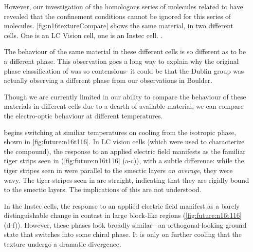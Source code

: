 \documentclass[aagreenthesis]{subfiles}
\begin{document}
However, our investigation of the homologous series of molecules related to
\nfour{} have revealed that the confinement conditions cannot be ignored for
this series of molecules. \autoref{fig:n16textureCompare} shows the same
material, \nsix{} in two different cells. One is an LC Vision cell, one is an
Instec cell.
.

The behaviour of the same material in these different cells is so different as
to be a different phase. This observation goes a long way to explain why the
original phase classification of \nfour{} was so contensious- it could be that
the Dublin group was actually observing a different phase from our observations
in Boulder.

Though we are currently limited in our ability to compare the behaviour of these
materials in different cells due to a dearth of available material, we can
compare the electro-optic behaviour at different temperatures.

\nsix{} begins switching at similiar temperatures on cooling from the isotropic
phase, shown in \autoref{fig:future:n16t116}. In LC vision cells (which were used to characterize the \nfour{}
compound), the response to an applied electric field manifests as the familiar
tiger strips seen in \nfour{} (\autoref{fig:future:n16t116} (a-c)), with a subtle difference: while the tiger stripes
seen in \nfour{} were parallel to the smectic layers \textit{on average}, they
were wavy. The tiger-stripes seen in \nsix{} are straight, indicating that they
are rigidly bound to the smectic layers. The implications of this are not
understood.

In the Instec cells, the response to an applied electric field manifest as a
barely distinguishable change in contast in large block-like regions
(\autoref{fig:future:n16t116}(d-f)). However,
these phases look broadly similar-- an orthogonal-looking ground state that
switches into some chiral phase. It is only on further cooling that the texture
undergo a dramatic divergence.
\end{document}

